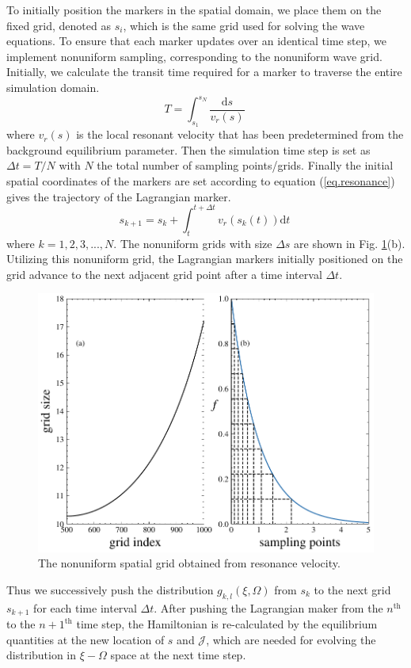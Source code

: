 To initially position the markers in the spatial domain, we place them on the fixed grid, denoted as $s_i$, which is the same grid used for solving the wave equations. To ensure that each marker updates over an identical time step, we implement nonuniform sampling, corresponding to the nonuniform wave grid. Initially, we calculate the transit time required for a marker to traverse the entire simulation domain.
\begin{equation}
    T = \int_{s_1}^{s_N} \frac{\mathrm{d}s}{v_r(s)}~
\end{equation}
where $v_r(s)$ is the local resonant velocity that has been predetermined from the background equilibrium parameter.
Then the simulation time step is set as $\Delta t = T/N$ with $N$ the total number of sampling points/grids.
Finally the initial spatial coordinates of the markers are set according to equation (\ref{eq.resonance}) gives the trajectory of the Lagrangian marker. 
\begin{equation}
    s_{k+1} = s_k +  \int_{t}^{t+\Delta t} v_r(s_k(t)) \mathrm{d}t~
\end{equation}
where $k=1,2,3,...,N$.
The nonuniform grids with size $\Delta s$ are shown in Fig. \ref{fig.uni_grid}(b). 
Utilizing this nonuniform grid, the Lagrangian markers initially positioned on the grid advance to the next adjacent grid point after a time interval $\Delta t$.
\begin{figure}[htbp]
    \centering
    \includegraphics[scale=0.5]{cpc_img/fig_nu_grid.pdf}
    \caption{The nonuniform spatial grid obtained from resonance velocity. 
    }
    \label{fig.uni_grid}
\end{figure}
Thus we successively push the distribution $g_{k,l}(\xi,\Omega)$  from  $s_k$ to the next grid $s_{k+1}$ for each time interval $\Delta t$.
After pushing the Lagrangian maker from the $n^\mathrm{th}$ to the $n+1^\mathrm{th}$ time step, the Hamiltonian  is re-calculated by  the  equilibrium quantities  at the new location of $s$ and $\mathcal{J}$, which are needed for evolving the distribution in $\xi-\Omega$ space at the next time step.

